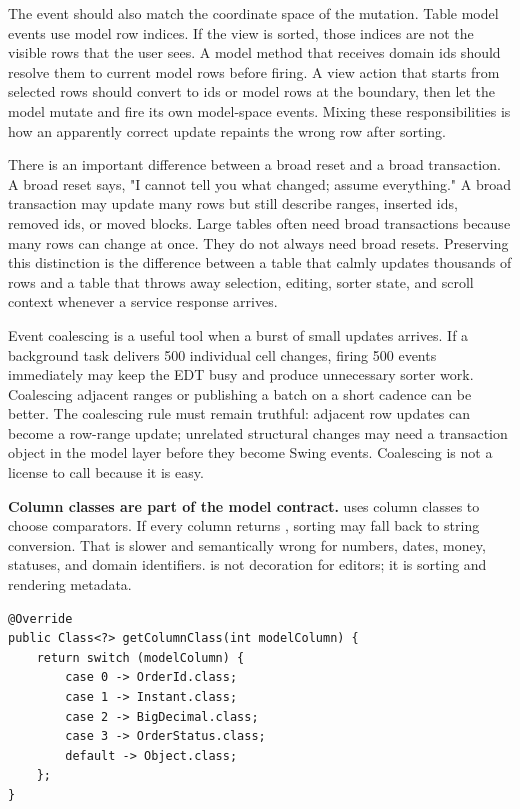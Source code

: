 The event should also match the coordinate space of the mutation. Table model events use model row indices. If the view is sorted, those indices are not the visible rows that the user sees. A model method that receives domain ids should resolve them to current model rows before firing. A view action that starts from selected rows should convert to ids or model rows at the boundary, then let the model mutate and fire its own model-space events. Mixing these responsibilities is how an apparently correct update repaints the wrong row after sorting.

There is an important difference between a broad reset and a broad transaction. A broad reset says, "I cannot tell you what changed; assume everything." A broad transaction may update many rows but still describe ranges, inserted ids, removed ids, or moved blocks. Large tables often need broad transactions because many rows can change at once. They do not always need broad resets. Preserving this distinction is the difference between a table that calmly updates thousands of rows and a table that throws away selection, editing, sorter state, and scroll context whenever a service response arrives.

Event coalescing is a useful tool when a burst of small updates arrives. If a background task delivers 500 individual cell changes, firing 500 events immediately may keep the EDT busy and produce unnecessary sorter work. Coalescing adjacent ranges or publishing a batch on a short cadence can be better. The coalescing rule must remain truthful: adjacent row updates can become a row-range update; unrelated structural changes may need a transaction object in the model layer before they become Swing events. Coalescing is not a license to call  because it is easy.

\textbf{Column classes are part of the model contract.}  uses column classes to choose comparators. If every column returns , sorting may fall back to string conversion. That is slower and semantically wrong for numbers, dates, money, statuses, and domain identifiers.  is not decoration for editors; it is sorting and rendering metadata.

\begin{lstlisting}[caption={Column metadata as part of the table model contract.}]
@Override
public Class<?> getColumnClass(int modelColumn) {
    return switch (modelColumn) {
        case 0 -> OrderId.class;
        case 1 -> Instant.class;
        case 2 -> BigDecimal.class;
        case 3 -> OrderStatus.class;
        default -> Object.class;
    };
}
\end{lstlisting}

